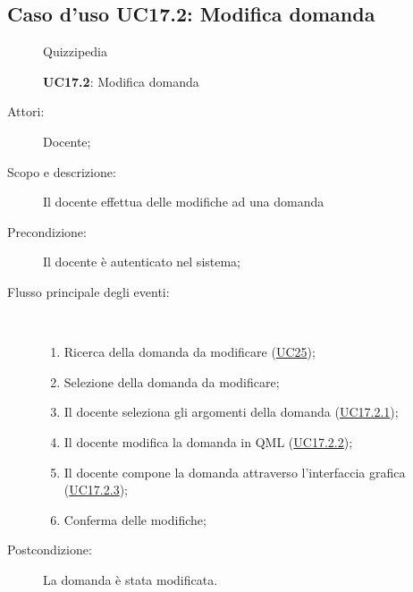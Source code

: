 \subsection{Caso d'uso UC17.2: Modifica domanda}
\begin{figure}[H]
	\centering
	\begin{resizedtikzpicture}{\textwidth}
		\begin{umlsystem}[x=0, fill=lightgray!20]{Quizzipedia}
		\end{umlsystem}
	\end{resizedtikzpicture}
	\caption{\textbf{UC17.2}: Modifica domanda}
	\label{UC17.2}
\end{figure}
\begin{description}
	\item[Attori:] Docente;
	\item[Scopo e descrizione:] Il docente effettua delle modifiche ad una domanda 
	\item[Precondizione:] Il docente è autenticato nel sistema;
	
	\item[Flusso principale degli eventi:] \ 
	\begin{enumerate}
		\item Ricerca della domanda da modificare (\hyperlink{UC25}{UC25});
		\item Selezione della domanda da modificare;
		\item Il docente seleziona gli argomenti della domanda	 (\hyperlink{UC17.2.1}{UC17.2.1});
		\item Il docente modifica la domanda in QML	 (\hyperlink{UC17.2.2}{UC17.2.2});
		\item Il docente compone la domanda attraverso l'interfaccia grafica (\hyperlink{UC17.2.3}{UC17.2.3});
		\item Conferma delle modifiche;
		
	\end{enumerate}
	\item[Postcondizione:] La domanda è stata modificata.
\end{description}
\hypertarget{UC17.2.1}{}
